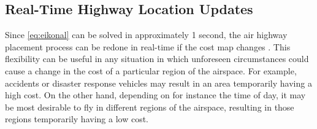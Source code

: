 \subsection{Real-Time Highway Location Updates}
Since \eqref{eq:eikonal} can be solved in approximately 1 second, the air highway placement process can be redone in real-time if the cost map changes . This flexibility can be useful in any situation in which unforeseen circumstances could cause a change in the cost of a particular region of the airspace. For example, accidents or disaster response vehicles may result in an area temporarily having a high cost. On the other hand, depending on for instance the time of day, it may be most desirable to fly in different regions of the airspace, resulting in those regions temporarily having a low cost.